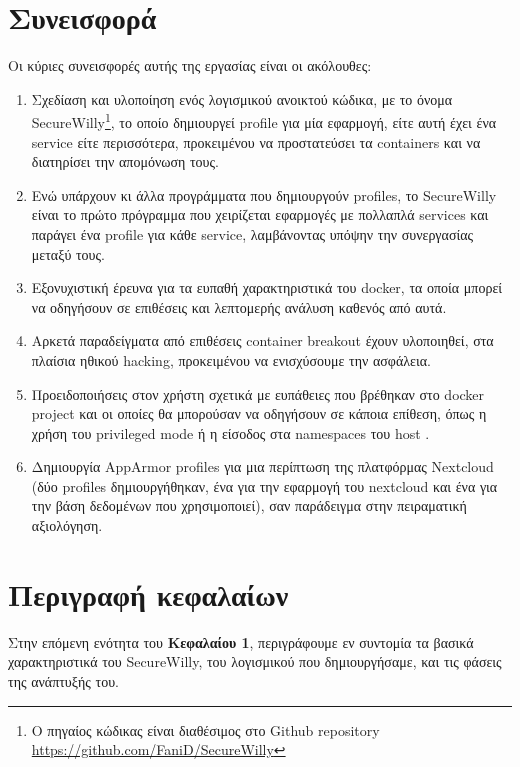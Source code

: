 \section*{Συνεισφορά}
Οι κύριες συνεισφορές αυτής της εργασίας είναι οι ακόλουθες:
\begin{enumerate}
\item Σχεδίαση και υλοποίηση ενός λογισμικού ανοικτού κώδικα, με το όνομα \en SecureWilly\gr{}\footnote{Ο πηγαίος κώδικας είναι διαθέσιμος στο \en Github repository \url{https://github.com/FaniD/SecureWilly}}\gr{}, το οποίο δημιουργεί \en profile\gr{} για μία εφαρμογή, είτε αυτή έχει ένα \en service\gr{} είτε περισσότερα, προκειμένου να προστατεύσει τα \en containers\gr{} και να διατηρίσει την απομόνωση τους.
\item Ενώ υπάρχουν κι άλλα προγράμματα που δημιουργούν \en profiles\gr{}, το \en SecureWilly\gr{} είναι το πρώτο πρόγραμμα που χειρίζεται εφαρμογές με πολλαπλά \en services\gr{} και παράγει ένα \en profile\gr{} για κάθε \en service\gr{}, λαμβάνοντας υπόψην την συνεργασίας μεταξύ τους.
\item Εξονυχιστική έρευνα για τα ευπαθή χαρακτηριστικά του \en docker\gr{}, τα οποία μπορεί να οδηγήσουν σε επιθέσεις και λεπτομερής ανάλυση καθενός από αυτά.
\item Αρκετά παραδείγματα από επιθέσεις \en container breakout\gr{} έχουν υλοποιηθεί, στα πλαίσια ηθικού \en hacking\gr{}, προκειμένου να ενισχύσουμε την ασφάλεια.
\item Προειδοποιήσεις στον χρήστη σχετικά με ευπάθειες που βρέθηκαν στο \en docker project\gr{} και οι οποίες θα μπορούσαν να οδηγήσουν σε κάποια επίθεση, όπως η χρήση του \en privileged mode \gr{} ή η είσοδος στα \en namespaces\gr{} του \en host \gr{}.
\item Δημιουργία \en AppArmor profiles\gr{} για μια περίπτωση της πλατφόρμας \en Nextcloud\gr{} (δύο \en profiles\gr{} δημιουργήθηκαν, ένα για την εφαρμογή του \en nextcloud\gr{} και ένα για την βάση δεδομένων που χρησιμοποιεί), σαν παράδειγμα στην πειραματική αξιολόγηση.
\end{enumerate}

\section*{Περιγραφή κεφαλαίων}
Στην επόμενη ενότητα του \textbf{Κεφαλαίου 1}, περιγράφουμε εν συντομία τα βασικά χαρακτηριστικά του \en SecureWilly\gr{}, του λογισμικού που δημιουργήσαμε, και τις φάσεις της ανάπτυξής του.

